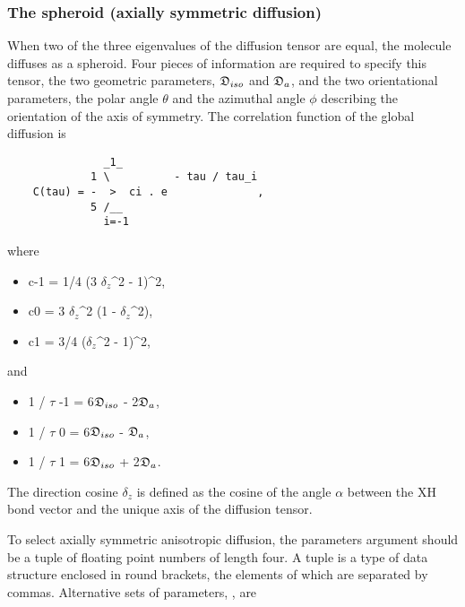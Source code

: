 \subsubsection{The spheroid (axially symmetric diffusion)}

When two of the three eigenvalues of the diffusion tensor are equal, the molecule diffuses as a spheroid.  Four pieces of information are required to specify this tensor, the two geometric parameters, $\mathfrak{D}_{iso}$ and $\mathfrak{D}_a$, and the two orientational parameters, the polar angle $\theta$ and the azimuthal angle $\phi$ describing the orientation of the axis of symmetry.  The correlation function of the global diffusion is


{\footnotesize \begin{verbatim}
               _1_
             1 \          - tau / tau_i
    C(tau) = -  >  ci . e              ,
             5 /__
               i=-1
\end{verbatim}}

where


\begin{itemize}
\item[] c-1 = 1/4 (3 $\delta_z$\^{}2 - 1)\^{}2, 
\item[] c0  = 3 $\delta_z$\^{}2 (1 - $\delta_z$\^{}2), 
\item[] c1  = 3/4 ($\delta_z$\^{}2 - 1)\^{}2, 
\end{itemize}


and


\begin{itemize}
\item[] 1 / $\tau$ -1 = 6$\mathfrak{D}_{iso}$ - 2$\mathfrak{D}_a$, 
\item[] 1 / $\tau$ 0  = 6$\mathfrak{D}_{iso}$ - $\mathfrak{D}_a$, 
\item[] 1 / $\tau$ 1  = 6$\mathfrak{D}_{iso}$ + 2$\mathfrak{D}_a$. 
\end{itemize}


The direction cosine $\delta_z$ is defined as the cosine of the angle $\alpha$ between the XH bond vector and the unique axis of the diffusion tensor.


To select axially symmetric anisotropic diffusion, the parameters argument should be a tuple of floating point numbers of length four.  A tuple is a type of data structure enclosed in round brackets, the elements of which are separated by commas.  Alternative sets of parameters, , are


